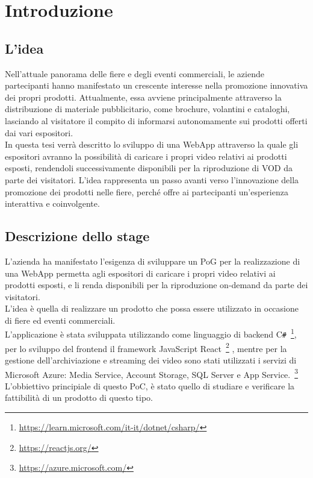 \chapter{Introduzione}
\label{cap:introduzione}

\section{L'idea}
Nell'attuale panorama delle fiere e degli eventi commerciali, le aziende partecipanti hanno manifestato un crescente interesse nella promozione innovativa
dei propri prodotti. Attualmente, essa avviene principalmente attraverso la distribuzione di materiale pubblicitario, come brochure, volantini e cataloghi, 
lasciando al visitatore il compito di informarsi autonomamente sui prodotti offerti dai vari espositori.\\
In questa tesi verrà descritto lo sviluppo di una \gls{WebApp} attraverso la quale gli espositori avranno la possibilità di caricare i propri video
relativi ai prodotti esposti, rendendoli successivamente disponibili per la riproduzione di \gls{VOD} da parte dei visitatori.
L'idea rappresenta un passo avanti verso l'innovazione della promozione dei prodotti nelle fiere, perché offre ai partecipanti un'esperienza interattiva 
e coinvolgente.\\

\section{Descrizione dello stage}

L'azienda ha manifestato l'esigenza di sviluppare un \gls{PoG} per la realizzazione di una WebApp permetta agli espositori di caricare i propri video relativi ai prodotti esposti, e li renda disponibili per la riproduzione on-demand da parte dei visitatori.\\
L'idea è quella di realizzare un prodotto che possa essere utilizzato in occasione di fiere ed eventi commerciali.\\
L'applicazione è stata sviluppata utilizzando come linguaggio di backend C\texttt{\#}~\footnote{\url{https://learn.microsoft.com/it-it/dotnet/csharp/}}, per lo sviluppo del frontend il framework JavaScript React~\footnote{\url{https://reactjs.org/}}  ,
mentre per la gestione dell'archiviazione e streaming dei video sono stati utilizzati i servizi di Microsoft Azure: Media Service, Account Storage, SQL Server e App Service.~\footnote{\url{https://azure.microsoft.com/}}\\
L'obbiettivo principiale di questo PoC, è stato quello di studiare e verificare la fattibilità di un prodotto di questo tipo.\\
